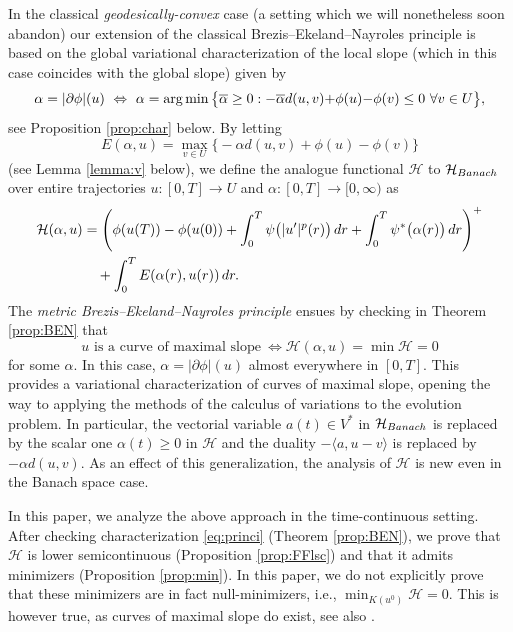 \documentclass[10pt,a4paper]{amsart}
\newcommand{\dr}{{\rm d} r}
\newcommand{\ove}{\overline}
\DeclareMathOperator*{\argmin}{{\rm arg\,min}}
\renewcommand{\sl}{|\partial \phi|}
\newcommand{\HH}{{\mathcal H}}
\begin{document}
In the
classical {\it geodesically-convex} case  (a setting which we will nonetheless
soon abandon)
  our extension of the classical Brezis--Ekeland--Nayroles principle  is 
based on the global variational characterization of the local slope (which in this case coincides with the global slope) given by
\begin{equation} \alpha = \sl(u) \ \Leftrightarrow \  \alpha =\argmin \big\{\ove
  \alpha \geq 0 :  -\ove \alpha d(u,v){+}\phi(u){-}\phi(v) \leq 0\  \forall v \in
  U\big\},\label{eq:introchar}
\end{equation}
see Proposition
\ref{prop:char} below.
By letting $$ E(\alpha,u) = \max_{v\in U} \big\{- \alpha
d(u,v)+\phi(u)-\phi(v) \big\}$$ (see Lemma \ref{lemma:v} below),  we
define the analogue functional $\HH$ to $ \HH_{\rm Banach}$ over entire trajectories $u:[0,T]\to
U$ and $\alpha: [0,T]\to [0,\infty)$ as
\begin{align*}
    \HH(\alpha,u) &=
       \left(\phi(u(T))-\phi(u(0)) +\int_0^T \psi\big( |u'|^p(r)\big)\,\dr + \int_0^T  \psi^*\big(\alpha(r)\big)\,\dr\right)^+ \\
  &\quad  +  \int_0^T E
                            (\alpha(r),u(r))\, \dr.
\end{align*}
The {\it metric Brezis--Ekeland--Nayroles principle}
ensues by checking in Theorem \ref{prop:BEN} that 
\begin{equation}
  \boxed{\text{$u$ is a curve of maximal slope} \ \Leftrightarrow  \HH(\alpha ,u)
  = \min\HH=0}
  \label{eq:princi}
  \end{equation}
 for some $\alpha$. In this case, $\alpha =\sl(u)$ almost
  everywhere in $[0,T]$. This provides a variational characterization
  of curves of maximal slope, opening the way to applying the methods
  of the calculus of variations  to the evolution problem.  In particular,
the vectorial variable $a(t)\in V^*$ in $\HH_{\rm Banach}$ is replaced by the scalar one
$\alpha(t)\geq 0$ in $\HH$ and the duality $ -\langle a,u-v
\rangle$ is replaced by  $-\alpha d(u,v)$. As  an  effect of this generalization, the
analysis of $\HH$ is new even in the Banach space case.
  
  In
  this paper, we  analyze the above approach in the time-continuous
  setting.   After checking 
  characterization \eqref{eq:princi} (Theorem \ref{prop:BEN}),
we prove that $\HH$ is
  lower semicontinuous (Proposition \ref{prop:FFlsc}) and that it
  admits minimizers (Proposition \ref{prop:min}).  In this paper, we do not explicitly prove that these minimizers are in fact null-minimizers, i.e., $\min_{K(u^0)}\HH=0$. This is however true, as curves of maximal slope do exist, see also \cite{cuore3}. 
\end{document}
